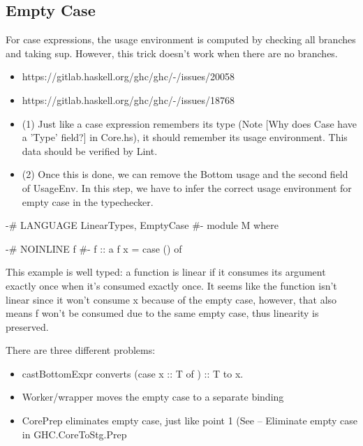 \documentclass[a4paper, draft]{article}
\begin{document}
\begin{code}
\subsection{Empty Case}

For case expressions, the usage environment is computed by checking all branches
and taking sup. However, this trick doesn't work when there are no branches.

\begin{itemize}
\item https://gitlab.haskell.org/ghc/ghc/-/issues/20058
\item https://gitlab.haskell.org/ghc/ghc/-/issues/18768

\item (1) Just like a case expression remembers its type (Note [Why does Case have a
'Type' field?] in Core.hs), it should remember its usage environment. This data
should be verified by Lint.

\item (2) Once this is done, we can remove the Bottom usage and the second field of
UsageEnv. In this step, we have to infer the correct usage environment for empty
case in the typechecker.
\end{itemize}

\begin{code}
{-# LANGUAGE LinearTypes, EmptyCase #-}
module M where

{-# NOINLINE f #-}
f :: a %
f x = case () of {}
\end{code}

This example is well typed: a function is linear if it consumes its argument
exactly once when it's consumed exactly once. It seems like the function isn't
linear since it won't consume x because of the empty case, however, that also
means f won't be consumed due to the same empty case, thus linearity is
preserved.


There are three different problems:

\begin{itemize}
\item castBottomExpr converts (case x :: T of {}) :: T to x.
\item Worker/wrapper moves the empty case to a separate binding
\item CorePrep eliminates empty case, just like point 1 (See -- Eliminate empty
    case in GHC.CoreToStg.Prep
\end{itemize}


\end{code}
\end{document}
